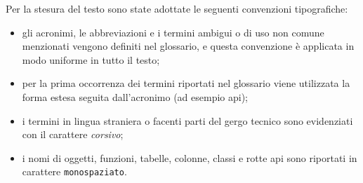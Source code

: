 Per la stesura del testo sono state adottate le seguenti convenzioni tipografiche:
\begin{itemize}
    \item gli acronimi, le abbreviazioni e i termini ambigui o di uso non comune menzionati vengono definiti nel glossario, e questa convenzione è applicata in modo uniforme in tutto il testo;
    \item per la prima occorrenza dei termini riportati nel glossario viene utilizzata la forma estesa seguita dall’acronimo (ad esempio \gls{api});
    \item i termini in lingua straniera o facenti parti del gergo tecnico sono evidenziati con il carattere \textit{corsivo};
    \item i nomi di oggetti, funzioni, tabelle, colonne, classi e rotte \gls{api} sono riportati in carattere \texttt{monospaziato}.
\end{itemize}

\newpage
